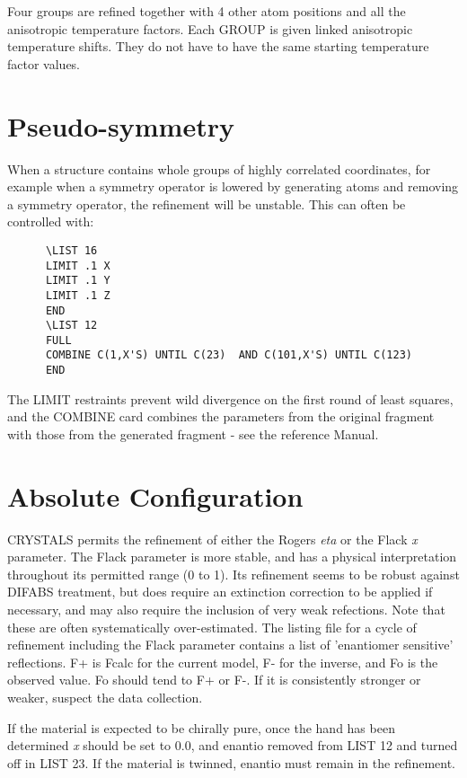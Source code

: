\documentclass[10pt,a4paper]{report}
\begin{document}
Four groups are refined together with 4 other atom positions and all
 the anisotropic temperature factors. Each GROUP is given linked
 anisotropic temperature shifts. They do not have to have the same
 starting temperature factor values.




\section{Pseudo-symmetry }


When a structure contains whole groups of highly correlated coordinates,
 for example when a symmetry operator is lowered by generating atoms and
 removing a symmetry operator, the refinement will be unstable. This can often
 be controlled with:

\small\begin{verbatim}
      \LIST 16
      LIMIT .1 X
      LIMIT .1 Y
      LIMIT .1 Z
      END
      \LIST 12
      FULL
      COMBINE C(1,X'S) UNTIL C(23)  AND C(101,X'S) UNTIL C(123)
      END
\end{verbatim}\normalsize




The LIMIT restraints prevent wild divergence on the first round of least
 squares, and the COMBINE  card combines the parameters from the original
 fragment with those from the generated fragment - see the reference
 Manual.



\section{Absolute Configuration}


CRYSTALS permits the refinement of either the Rogers \emph{eta} or the
Flack \emph{x} parameter. The Flack parameter is more stable, and has a
physical interpretation throughout its permitted range (0 to 1). Its
refinement seems to be robust against DIFABS treatment, but does require
an extinction correction to be applied if necessary, and may also
require the inclusion of very weak refections. Note that these are often
systematically over-estimated. The listing file for a cycle of
refinement including the Flack parameter contains a list of 'enantiomer
sensitive' reflections. F+ is Fcalc for the current model, F- for the
inverse, and Fo is the observed value. Fo should tend to F+ or F-. If it
is consistently stronger or weaker, suspect the data collection.


If the material is expected to be chirally pure, once the hand has
been determined \emph{x} should be set to 0.0, and enantio removed from LIST
12 and turned off in LIST 23. If the material is twinned, enantio must
remain in the refinement.
\end{document}
